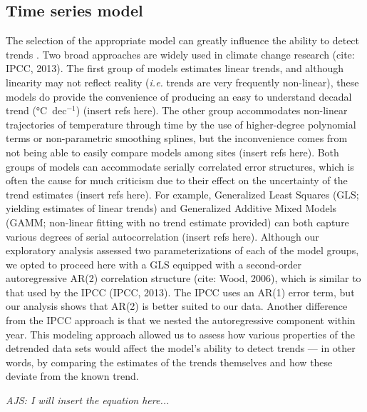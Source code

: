\documentclass{ametsoc}
\begin{document}
\subsection{Time series model}
The selection of the appropriate model can greatly influence the ability to detect trends \citet{Franzke2012}. Two broad approaches are widely used in climate change research (cite: IPCC, 2013). The first group of models estimates linear trends, and although linearity may not reflect reality (\emph{i.e.} trends are very frequently non-linear), these models do provide the convenience of producing an easy to understand decadal trend (\si{\degreeCelsius}~dec$^{-1}$) (insert refs here). The other group accommodates non-linear trajectories of temperature through time by the use of higher-degree polynomial terms or non-parametric smoothing splines, but the inconvenience comes from not being able to easily compare models among sites (insert refs here). Both groups of models can accommodate serially correlated error structures, which is often the cause for much criticism due to their effect on the uncertainty of the trend estimates (insert refs here). For example, Generalized Least Squares (GLS; yielding estimates of linear trends) and Generalized Additive Mixed Models (GAMM; non-linear fitting with no trend estimate provided) can both capture various degrees of serial autocorrelation (insert refs here). Although our exploratory analysis assessed two parameterizations of each of the model groups, we opted to proceed here with a GLS equipped with a second-order autoregressive AR(2) correlation structure (cite: Wood, 2006), which is similar to that used by the IPCC (IPCC, 2013). The IPCC uses an AR(1) error term, but our analysis shows that AR(2) is better suited to our data. Another difference from the IPCC approach is that we nested the autoregressive component within year. This modeling approach allowed us to assess how various properties of the detrended data sets would affect the model’s ability to detect trends --- in other words, by comparing the estimates of the trends themselves and how these deviate from the known trend.

\emph{AJS: I will insert the equation here...}
\end{document}
